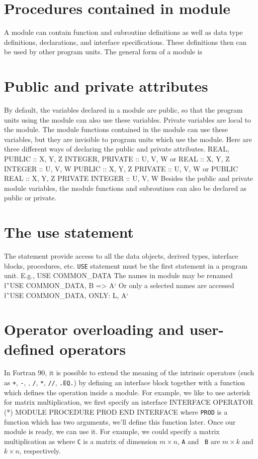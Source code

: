 {{\section{Procedures contained in module}
A module can contain function and subroutine definitions as well as
data type definitions, declarations, and interface specifications.
These definitions then can be used by other program units.  The
general form of a module is 
\sms
{}
\sms

\section{Public and private attributes}
By default, the variables declared in a module are public, so that
the program units  using the module can also use these variables.
Private variables are local to the module.  The module functions
contained in the module
can use these variables, but they are invisible to program units
which use the module.  Here are three different ways of declaring
the public and private attributes.
\ttbg
REAL, PUBLIC :: X, Y, Z
INTEGER, PRIVATE :: U, V, W
\tted
or
\ttbg
REAL :: X, Y, Z
INTEGER :: U, V, W
PUBLIC :: X, Y, Z
PRIVATE :: U, V, W
\tted
or
\ttbg
PUBLIC
   REAL :: X, Y, Z
PRIVATE
   INTEGER :: U, V, W
\tted
Besides the public and private module variables, the module
functions and subroutines can also be declared as public or private.

\section{The use statement}
The statement
\sms
{}
\sms
provide access to all the data objects, derived types, interface
blocks, procedures, etc.  {\tt USE} statement must be the first
statement in a program unit.  E.g.,
\ttbg
USE COMMON_DATA
\tted
The names in module may be renamed
\sms
\l{\v`USE COMMON_DATA, B => A`}
\sms
Or only a selected names are accessed
\sms
\l{\v`USE COMMON_DATA, ONLY: L, A`}
\sms

\section{Operator overloading and user-defined operators}
In Fortran 90, it is possible to extend the meaning of the 
intrinsic operators (such as {\tt +}, {\tt -}, {\tt *}, {\tt /}, {\tt **}, 
{\tt //}, {\tt .EQ.}) by defining an interface block together with a 
function which defines the operation inside a module.  For example, 
we like to use asterisk for  matrix multiplication, we first specify an 
interface
\ttbg
INTERFACE OPERATOR (*)
   MODULE PROCEDURE PROD
END INTERFACE
\tted
where {\tt PROD} is a function which has two arguments, we'll define
this function later.  Once our module is ready, we can use it.
For example, we could specify a matrix multiplication as
\sms
{}
\sms
where {\tt C} is a matrix of dimension $m \times n$, {\tt A} and {\tt
B} are $m\times k$ and $k \times n$, respectively. 

}}
